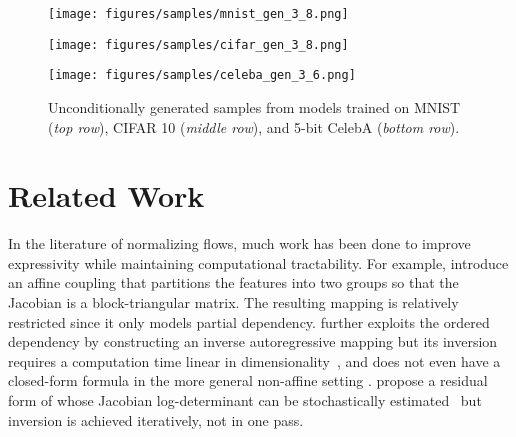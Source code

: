 \documentclass{article}
\begin{document}
\begin{table*}[ht]
\centering
{}
\caption{\small Evaluation on Inception Score (IS, the higher the better) and Fréchet Inception Distance (FID, the lower the better) of models trained on CIFAR 10. Results taken from \citet{ostrovski2018autoregressive}, \citet{chen2019residualflows}, \citet{vaeflow}, and \citet{gulrajani2017improved,heusel2017gans}. 
Parenthesis indicates two time-scale update rule for WGAN-GP.
}
\label{tab:scores}
\end{table*}
\begin{figure}[t!]
    \centering
\texttt{[image: figures/samples/mnist\_gen\_3\_8.png]}
    
    \vspace{1mm}
    
\texttt{[image: figures/samples/cifar\_gen\_3\_8.png]}
    
    \vspace{1mm}
    
\texttt{[image: figures/samples/celeba\_gen\_3\_6.png]}
    \vspace{-3mm}
    \caption{\small Unconditionally generated samples from models trained on MNIST (\emph{top row}), CIFAR 10 (\emph{middle row}), and 5-bit CelebA (\emph{bottom row}). 
}
    \label{fig:samples}
\end{figure}


\section{Related Work}
In the literature of normalizing flows, much work has been done to improve expressivity while maintaining computational tractability. 
For example, \citet{dinh2014nice,dinh2016density} introduce an affine coupling that partitions the features into two groups so that the Jacobian is a block-triangular matrix. 
The resulting mapping is relatively restricted since it only models partial dependency. 
\citet{kingma2016improved} further exploits the ordered dependency by constructing an inverse autoregressive mapping but its inversion requires a computation time linear in dimensionality~\citep{papamakarios2017masked}, 
and does not even have a closed-form formula in the more general non-affine setting \citep{huang2018neural}.
\citet{behrmann2018invertible} propose a residual form of  whose Jacobian log-determinant can be stochastically estimated~\citep{chen2019residualflows} but inversion is achieved iteratively, not in one pass. 
\end{document}
